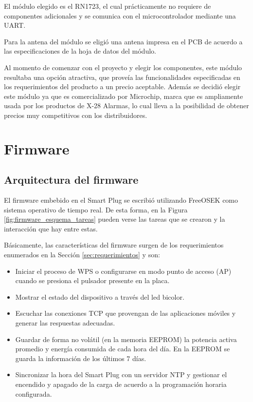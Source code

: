 El módulo elegido es el RN1723, el cual prácticamente no requiere de componentes adicionales y se comunica con el microcontrolador mediante una UART.

Para la antena del módulo se eligió una antena impresa en el PCB de acuerdo a las especificaciones de la hoja de datos del módulo.

Al momento de comenzar con el proyecto y elegir los componentes, este módulo resultaba una opción atractiva, que proveía las funcionalidades especificadas en los requerimientos del producto a un precio aceptable. Además se decidió elegir este módulo ya que es comercializado por Microchip, marca que es ampliamente usada por los productos de X-28 Alarmas, lo cual lleva a la posibilidad de obtener precios muy competitivos con los distribuidores.

\section{Firmware}

\subsection{Arquitectura del firmware}
\label{subsec:firmware_arquitectura}

El firmware embebido en el Smart Plug se escribió utilizando FreeOSEK como sistema operativo de tiempo real. De esta forma, en la Figura \ref{fig:firmware_esquema_tareas} pueden verse las tareas que se crearon y la interacción que hay entre estas.

Básicamente, las características del firmware surgen de los requerimientos enumerados en la Sección \ref{sec:requerimientos} y son:

\begin{itemize}
\item Iniciar el proceso de WPS o configurarse en modo punto de acceso (AP) cuando se presiona el pulsador presente en la placa.
\item Mostrar el estado del dispositivo a través del led bicolor.
\item Escuchar las conexiones TCP que provengan de las aplicaciones móviles y generar las respuestas adecuadas.
\item Guardar de forma no volátil (en la memoria EEPROM) la potencia activa promedio y energía consumida de cada hora del día. En la EEPROM se guarda la información de los últimos 7 días.
\item  Sincronizar la hora del Smart Plug con un servidor NTP y gestionar el encendido y apagado de la carga de acuerdo a la programación horaria configurada.
\end{itemize}

